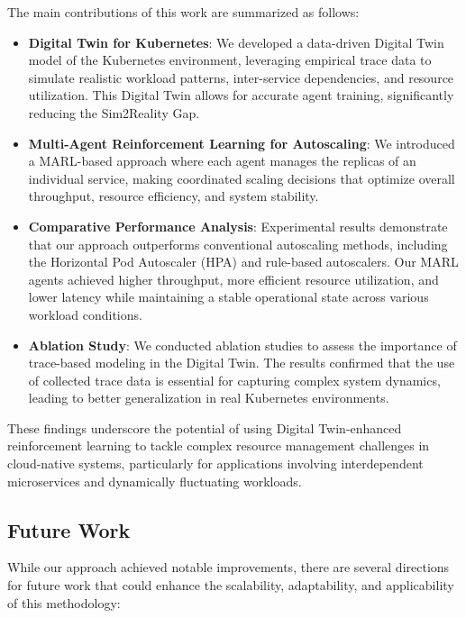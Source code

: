 \documentclass[conference]{IEEEtran}
\begin{document}
The main contributions of this work are summarized as follows:
\begin{itemize}
    \item \textbf{Digital Twin for Kubernetes}: We developed a data-driven Digital Twin model of the Kubernetes environment, leveraging empirical trace data to simulate realistic workload patterns, inter-service dependencies, and resource utilization. This Digital Twin allows for accurate agent training, significantly reducing the Sim2Reality Gap.
    \item \textbf{Multi-Agent Reinforcement Learning for Autoscaling}: We introduced a MARL-based approach where each agent manages the replicas of an individual service, making coordinated scaling decisions that optimize overall throughput, resource efficiency, and system stability.
    \item \textbf{Comparative Performance Analysis}: Experimental results demonstrate that our approach outperforms conventional autoscaling methods, including the Horizontal Pod Autoscaler (HPA) and rule-based autoscalers. Our MARL agents achieved higher throughput, more efficient resource utilization, and lower latency while maintaining a stable operational state across various workload conditions.
    \item \textbf{Ablation Study}: We conducted ablation studies to assess the importance of trace-based modeling in the Digital Twin. The results confirmed that the use of collected trace data is essential for capturing complex system dynamics, leading to better generalization in real Kubernetes environments.
\end{itemize}

These findings underscore the potential of using Digital Twin-enhanced reinforcement learning to tackle complex resource management challenges in cloud-native systems, particularly for applications involving interdependent microservices and dynamically fluctuating workloads.

\subsection{Future Work}

While our approach achieved notable improvements, there are several directions for future work that could enhance the scalability, adaptability, and applicability of this methodology:
\end{document}
